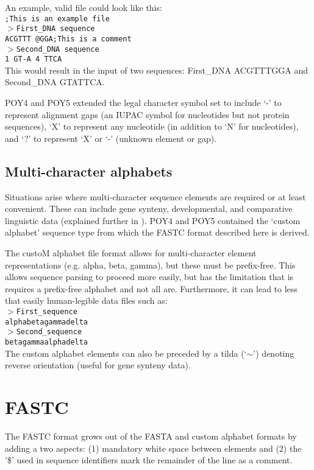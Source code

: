 \documentclass[12pt]{article}
\begin{document}
An example, valid file could look like this:\\
\texttt{;This is an example file}\\
\texttt{$>$First\_DNA sequence}\\
\texttt{ACGTTT @GGA;This is a comment}\\
\texttt{$>$Second\_DNA sequence}\\
\texttt{1 GT-A 4 TTCA }\\
This would result in the input of two sequences: First\_DNA  ACGTTTGGA and Second\_DNA GTATTCA.

POY4 \citep {POY4} and POY5 \citep {POY5, Wheeleretal2015} extended the legal character symbol set to include `-' to represent alignment gaps (an IUPAC symbol for nucleotides but not protein sequences), `X' to represent any nucleotide (in addition to `N' for nucleotides), and `?' to represent `X' or `-' (unknown element or gap).  

\subsection{Multi-character alphabets}
Situations arise where multi-character sequence elements are required or at least convenient.  These can include gene synteny, developmental, and comparative linguistic data (explained further in \citealp{SchulmeisterandWheeler2004,Wheeler2007, Wheeler2012, WheelerandWhiteley2015}).  POY4 and POY5 contained the `custom alphabet' sequence type from which the FASTC format described here is derived.

The custoM alphabet file format allows for multi-character element representations (e.g. alpha, beta, gamma), but these must be prefix-free.  This allows sequence parsing to proceed more easily, but has the limitation that is requires a prefix-free alphabet and not all are.  Furthermore, it
can lead to less that easily human-legible data files such as:\\
\texttt{$>$First\_sequence}\\
\texttt{alphabetagammadelta}\\
\texttt{$>$Second\_sequence}\\
\texttt{betagammaalphadelta}\\
The custom alphabet elements can also be preceded by a tilda (`$\sim$') denoting reverse orientation (useful for gene synteny data).

\section{FASTC}
The FASTC format grows out of the FASTA and custom alphabet formats by adding a two aspects: (1) mandatory white space between elements and (2) the '\$' used in sequence identifiers mark the remainder 
of the line as a comment.
\end{document}
